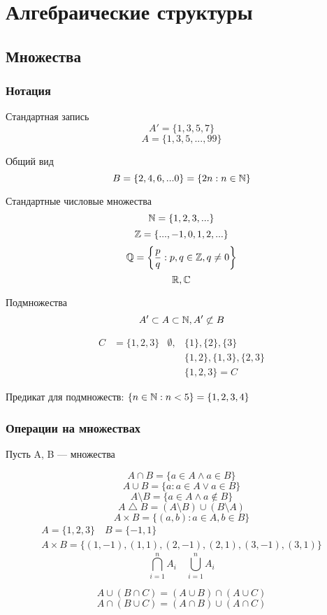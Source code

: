 \documentclass[main]{subfiles}
\begin{document}
\part{Алгебраические структуры}
\chapter{Множества}
\section{Нотация}

Стандартная запись
\[A' = \{1,3,5,7\}\]
\[A=\{1,3,5, ..., 99\}\]

Общий вид
\[B = \{2,4,6,...0\} = \{2n: n\in \mathbb{N}\}\]

Стандартные числовые множества
\[\mathbb{N} =\{1,2,3,...\} \]
\[\mathbb{Z} =\{...,-1,0,1,2,...\} \]
\[\mathbb{Q} = \left\{ \frac{p}{q}: p,q \in \mathbb{Z}, q \neq 0 \right\} \]
\[\mathbb{R}, \mathbb{C}\]

Подмножества
\[A' \subset A \subset \mathbb{N}, A' \not\subset B\]

\begin{align*}
    C & = \{1,2,3\} & \emptyset, & \{1\},  \{2\}, \{3\}     \\
      &             &            & \{1,2\},\{1,3\}, \{2,3\} \\
      &             &            & \{1,2,3\} = C
\end{align*}

Предикат для подмножеств: $\{n \in \mathbb{N} : n < 5\} = \{1,2,3,4\}$

\section{Операции на множествах}
Пусть A, B --- множества \marginpar{$\oplus \Leftrightarrow \bigtriangleup$}

\[A \cap B = \{a \in A \land  a \in B\}\]
\[A \cup B = \{a: a \in A \lor a \in B\}\]
\[A \setminus B = \{a\in A \land a\not\in B\}\]
\[A \bigtriangleup B = (A \setminus B) \cup (B \setminus A)\]
\[A \times B = \{(a,b):a\in A, b \in B\}\]
\begin{multline*}
    A = \{1,2,3\} \quad
    B = \{-1, 1\} \\
    A \times B = \{ (1,-1), (1,1), (2, -1), (2,1), (3, -1), (3,1)\}
\end{multline*}
\[\bigcap_{i=1}^n A_i \quad \bigcup_{i=1}^n A_i\]

\[A \cup (B \cap C) = (A \cup B) \cap (A \cup C)\]
\[A \cap (B \cup C) = (A \cap B) \cup (A \cap C)\]
\end{document}
